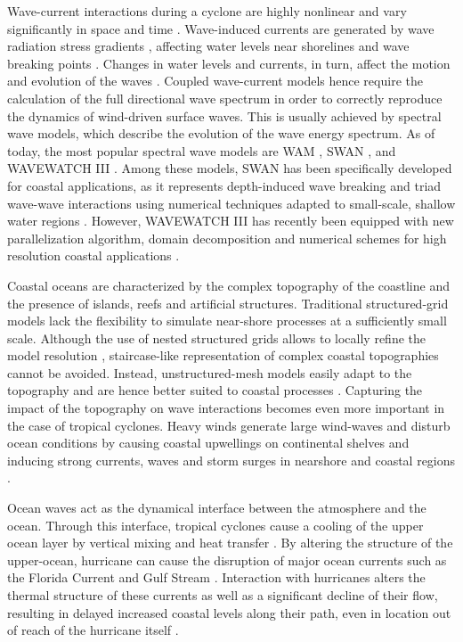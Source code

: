 \documentclass[preprint,12pt,authoryear]{elsarticle}
\begin{document}
Wave-current interactions during a cyclone are highly nonlinear and vary significantly in space and time \citep{wu2011fvcom}. Wave-induced currents are generated by wave radiation stress gradients \citep{longuet1970longshore}, affecting water levels near shorelines and wave breaking points \citep{longuet1964radiation}. Changes in water levels and currents, in turn, affect the motion and evolution of the waves \citep{sikiric2013coupling}. Coupled wave-current models hence require the calculation of the full directional wave spectrum in order to correctly reproduce the dynamics of wind-driven surface waves. This is usually achieved by spectral wave models, which describe the evolution of the wave energy spectrum. As of today, the most popular spectral wave models are WAM \citep{group1988wam}, %
SWAN \citep{booij1999third}, and WAVEWATCH III \citep{tolman2009user}. Among these models, SWAN has been specifically developed for coastal applications, as it represents depth-induced wave breaking and triad wave-wave interactions using numerical techniques adapted to small-scale, shallow water regions \citep{booij1999third}. However, WAVEWATCH III has recently been equipped with new parallelization algorithm, domain decomposition and numerical schemes for high resolution coastal applications \citep{ww3dg,abdolali2020large}.

Coastal oceans are characterized by the complex topography of the coastline and the presence of islands, reefs and artificial structures. Traditional structured-grid models lack the flexibility to simulate near-shore processes at a sufficiently small scale. Although the use of nested structured grids allows to locally refine the model resolution \citep{warner2010development}, staircase-like representation of complex coastal topographies cannot be avoided. Instead, unstructured-mesh models easily adapt to the topography and are hence better suited to coastal processes \citep{fringer2019future}. Capturing the impact of the topography on wave interactions becomes even more important in the case of tropical cyclones. Heavy winds generate large wind-waves and disturb ocean conditions \citep{liu2020impacts} by causing coastal upwellings on continental shelves \citep{smith1982response} and inducing strong currents, waves and storm surges in nearshore and coastal regions \citep{dietrich2010high, weisberg2006hurricane}. 

Ocean waves act as the dynamical interface between the atmosphere and the ocean. Through this interface, tropical cyclones cause a cooling of the upper ocean layer by vertical mixing and heat transfer \citep{aijaz2017nonbreaking,varlas2020investigating}. By altering the structure of the upper-ocean, hurricane can cause the disruption of major ocean currents such as the Florida Current and Gulf Stream \citep{oey2007hurricane}. Interaction with hurricanes alters the thermal structure of these currents as well as a significant decline of their flow, resulting in delayed increased coastal levels along their path, even in location out of reach of the hurricane itself \citep{ezer2017observations, ezer2018interaction}.
\end{document}
